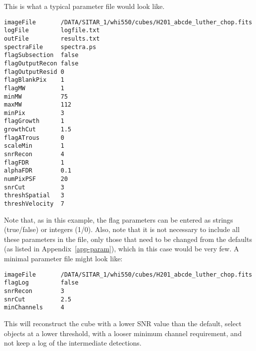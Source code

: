 \label{app-input}

This is what a typical parameter file would look like.

\begin{verbatim}
imageFile       /DATA/SITAR_1/whi550/cubes/H201_abcde_luther_chop.fits
logFile         logfile.txt
outFile         results.txt
spectraFile     spectra.ps
flagSubsection  false
flagOutputRecon false
flagOutputResid 0
flagBlankPix    1
flagMW          1
minMW           75
maxMW           112
minPix          3
flagGrowth      1
growthCut       1.5
flagATrous      0
scaleMin        1
snrRecon        4
flagFDR         1
alphaFDR        0.1
numPixPSF       20
snrCut          3
threshSpatial   3
threshVelocity  7
\end{verbatim}

Note that, as in this example, the flag parameters can be entered as
strings (true/false) or integers (1/0). Also, note that it is not
necessary to include all these parameters in the file, only those that
need to be changed from the defaults (as listed in
Appendix~\ref{app-param}), which in this case would be very few. A
minimal parameter file might look like:
\begin{verbatim}
imageFile       /DATA/SITAR_1/whi550/cubes/H201_abcde_luther_chop.fits
flagLog         false
snrRecon        3
snrCut          2.5
minChannels     4
\end{verbatim}
This will reconstruct the cube with a lower SNR value than the
default, select objects at a lower threshold,  with a looser minimum
channel requirement, and not keep a log of the intermediate
detections. 

